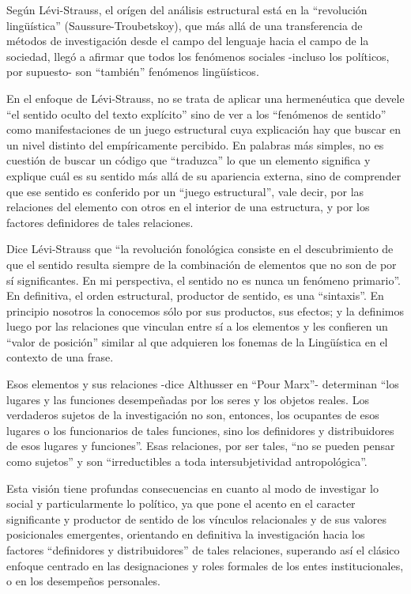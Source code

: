 \documentclass[
]{book}
\begin{document}
Según Lévi-Strauss, el orígen del análisis estructural está en la ``revolución lingüística'' (Saussure-Troubetskoy), que más allá de una transferencia de métodos de investigación desde el campo del lenguaje hacia el campo de la sociedad, llegó a afirmar que todos los fenómenos sociales -incluso los políticos, por supuesto- son ``también'' fenómenos lingüísticos.

En el enfoque de Lévi-Strauss, no se trata de aplicar una hermenéutica que devele ``el sentido oculto del texto explícito'' sino de ver a los ``fenómenos de sentido'' como manifestaciones de un juego estructural cuya explicación hay que buscar en un nivel distinto del empíricamente percibido. En palabras más simples, no es cuestión de buscar un código que ``traduzca'' lo que un elemento significa y explique cuál es su sentido más allá de su apariencia externa, sino de comprender que ese sentido es conferido por un ``juego estructural'', vale decir, por las relaciones del elemento con otros en el interior de una estructura, y por los factores definidores de tales relaciones.

Dice Lévi-Strauss que ``la revolución fonológica consiste en el descubrimiento de que el sentido resulta siempre de la combinación de elementos que no son de por sí significantes. En mi perspectiva, el sentido no es nunca un fenómeno primario''. En definitiva, el orden estructural, productor de sentido, es una ``sintaxis''. En principio nosotros la conocemos sólo por sus productos, sus efectos; y la definimos luego por las relaciones que vinculan entre sí a los elementos y les confieren un ``valor de posición'' similar al que adquieren los fonemas de la Lingüística en el contexto de una frase.

Esos elementos y sus relaciones -dice Althusser en ``Pour Marx''- determinan ``los lugares y las funciones desempeñadas por los seres y los objetos reales. Los verdaderos sujetos de la investigación no son, entonces, los ocupantes de esos lugares o los funcionarios de tales funciones, sino los definidores y distribuidores de esos lugares y funciones''. Esas relaciones, por ser tales, ``no se pueden pensar como sujetos'' y son ``irreductibles a toda intersubjetividad antropológica''.

Esta visión tiene profundas consecuencias en cuanto al modo de investigar lo social y particularmente lo político, ya que pone el acento en el caracter significante y productor de sentido de los vínculos relacionales y de sus valores posicionales emergentes, orientando en definitiva la investigación hacia los factores ``definidores y distribuidores'' de tales relaciones, superando así el clásico enfoque centrado en las designaciones y roles formales de los entes institucionales, o en los desempeños personales.
\end{document}
